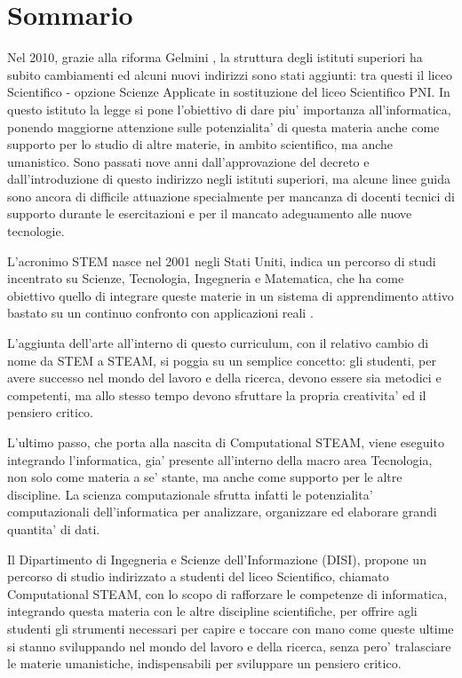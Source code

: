 \chapter*{Sommario} %
\label{sommario}


Nel 2010, grazie alla riforma Gelmini \cite{riforma}, la struttura degli istituti superiori ha subito cambiamenti ed alcuni nuovi indirizzi sono stati aggiunti: tra questi il liceo Scientifico - opzione Scienze Applicate in sostituzione del liceo Scientifico PNI. In questo istituto la legge si pone l'obiettivo di dare piu' importanza all'informatica, ponendo maggiorne attenzione sulle potenzialita' di questa materia anche come supporto per lo studio di altre materie, in ambito scientifico, ma anche umanistico. Sono passati nove anni dall'approvazione del decreto e dall'introduzione di questo indirizzo negli istituti superiori, ma alcune linee guida sono ancora di difficile attuazione specialmente per mancanza di docenti tecnici di supporto durante le esercitazioni e per il mancato adeguamento alle nuove tecnologie. 

L'acronimo STEM nasce nel 2001 negli Stati Uniti, indica un percorso di studi incentrato su Scienze, Tecnologia, Ingegneria e Matematica, che ha come obiettivo quello di integrare queste materie in un sistema di apprendimento attivo bastato su un continuo confronto con applicazioni reali \cite{stem_education}. 

L'aggiunta dell'arte all'interno di questo curriculum, con il relativo cambio di nome da STEM a STEAM, si poggia su un semplice concetto: gli studenti, per avere successo nel mondo del lavoro e della ricerca, devono essere sia metodici e competenti, ma allo stesso tempo devono sfruttare la propria creativita' ed il pensiero critico. 

L'ultimo passo, che porta alla nascita di Computational STEAM, viene eseguito integrando l'informatica, gia' presente all'interno della macro area Tecnologia, non solo come materia a se' stante, ma anche come supporto per le altre discipline. La scienza computazionale sfrutta infatti le potenzialita' computazionali dell'informatica per analizzare, organizzare ed elaborare grandi quantita' di dati.

Il Dipartimento di Ingegneria e Scienze dell'Informazione (DISI), propone un percorso di studio indirizzato a studenti del liceo Scientifico, chiamato Computational STEAM, con lo scopo di rafforzare le competenze di informatica, integrando questa materia con le altre discipline scientifiche, per offrire agli studenti gli strumenti necessari per capire e toccare con mano come queste ultime si stanno sviluppando nel mondo del lavoro e della ricerca, senza pero' tralasciare le materie umanistiche, indispensabili per sviluppare un pensiero critico.

